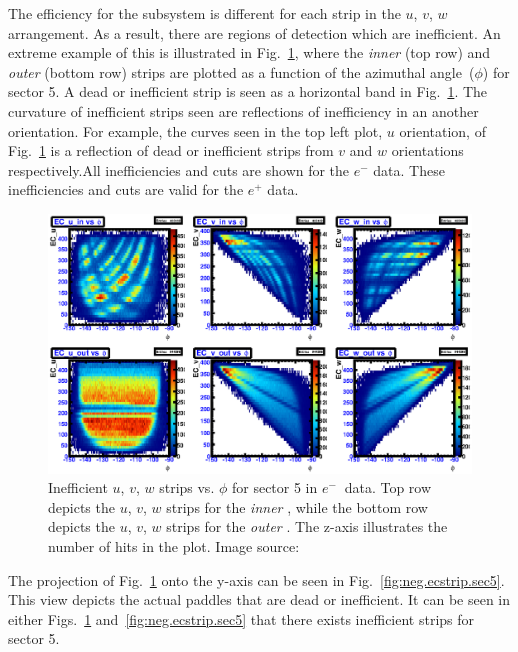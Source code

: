 The efficiency for the  subsystem is different for each strip in the $u$, $v$, $w$ arrangement. As a result, there are regions of detection which are inefficient. An extreme example of this is illustrated in Fig.~\ref{fig:neg:ec.sec5}, where the  \emph{inner} (top row) and \emph{outer} (bottom row) strips are plotted as a function of the azimuthal angle~($\phi$) for sector 5. A dead or inefficient strip is seen as a horizontal band in Fig.~\ref{fig:neg:ec.sec5}.  The curvature of inefficient strips seen are reflections of inefficiency in an another orientation. For example, the curves seen in the top left plot, $u$ orientation, of Fig.~\ref{fig:neg:ec.sec5} is a reflection of dead or inefficient strips from $v$ and $w$ orientations respectively.All inefficiencies and cuts are shown for the $e^-$ data. These inefficiencies and cuts are valid for the $e^+$ data.
%
\begin{figure}[htpb]\begin{center}
\includegraphics[width=\figwidth,height=\hfigheight]{figures/calib/ec/pim_ecuvw_phi_NOKnockout_sec5.eps}
\caption[Inefficient  $u$, $v$, $w$ strips vs. $\phi$ for sector 5 in  $e^{-} \ $ data]{\label{fig:neg:ec.sec5}Inefficient  $u$, $v$, $w$ strips vs. $\phi$ for sector 5 in  $e^{-} \ $ data. Top row depicts the $u$, $v$, $w$ strips for the \emph{inner} , while the bottom row depicts the $u$, $v$, $w$ strips for the \emph{outer} . The z-axis illustrates the number of hits in the plot. Image source:~\cite{clas.thesis.kunkel}}
\end{center}\end{figure}
%
The projection of Fig.~\ref{fig:neg:ec.sec5} onto the y-axis can be seen in Fig.~\ref{fig:neg.ecstrip.sec5}. This view depicts the actual paddles that are dead or inefficient. It can be seen in either Figs.~\ref{fig:neg:ec.sec5} and~\ref{fig:neg.ecstrip.sec5} that there exists inefficient  strips for sector 5.
